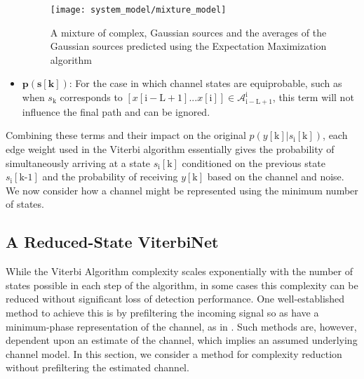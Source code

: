 \begin{itemize}

\begin{figure}[H]
\centering
	\texttt{[image: system\_model/mixture\_model]}
	  	  \caption{A mixture of complex, Gaussian sources and the averages of the Gaussian sources predicted using the Expectation Maximization algorithm}
	  \label{fig:mm}
\end{figure}

\item $\mathbf{p(s[\text{k}])}$: For the case in which channel states are equiprobable, such as when $s_{\text{k}}$ corresponds to $\left[x[\mathrm{i-L+1}]...x[\mathrm{i}]\right] \in \mathcal{A}_{\mathrm{i-L+1}}^{\mathrm{i}}$, this term will not influence the final path and can be ignored.

\end{itemize}

Combining these terms and their impact on the original $p(y[\mathrm{k}]|s_{\text{i}}[\text{k}])$, each edge weight used in the Viterbi algorithm essentially gives the probability of simultaneously arriving at a state $s_{\text{i}}[\text{k}]$ conditioned on the previous state $s_{\text{i}}[\text{k-1}]$ and the probability of receiving $y[\mathrm{k}]$ based on the channel and noise. 
We now consider how a channel might be represented using the minimum number of states.

\subsection{A Reduced-State ViterbiNet}\label{reduced_viterbi}
While the Viterbi Algorithm complexity scales exponentially with the number of states possible in each step of the algorithm, in some cases this complexity can be reduced without significant loss of detection performance. One well-established method to achieve this is by prefiltering the incoming signal so as have a minimum-phase representation of the channel, as in \cite{gerstacker2000efficient}. Such methods are, however, dependent upon an estimate of the channel, which  implies an assumed underlying channel model. In this section, we consider a method for complexity reduction without prefiltering the estimated channel.



